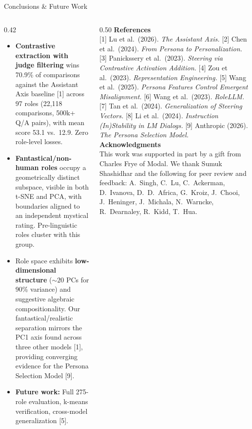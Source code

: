 \documentclass[final,t]{beamer}
\begin{document}
\begin{frame}[t]
\vspace{0mm}

\begin{block}{Conclusions \& Future Work}
\begin{columns}[T]
\begin{column}{0.42\textwidth}
\begin{itemize}[leftmargin=1em, itemsep=2pt, topsep=0pt, parsep=0pt, label=$\bullet$]
  \item \textbf{Contrastive extraction with judge filtering} wins
    70.9\% of comparisons against the Assistant Axis baseline [1]
    across 97 roles (22,118 comparisons, 500k+ Q/A pairs),
    with mean score 53.1 vs.\ 12.9. Zero role-level losses.
  \item \textbf{Fantastical/non-human roles} occupy a
    geometrically distinct subspace, visible in both t-SNE and
    PCA, with boundaries aligned to an independent mystical
    rating. Pre-linguistic roles cluster with this group.
  \item Role space exhibits \textbf{low-dimensional structure}
    (${\sim}20$ PCs for 90\% variance) and suggestive algebraic
    compositionality. Our fantastical/realistic separation
    mirrors the PC1 axis found across three other models [1],
    providing converging evidence for the Persona Selection
    Model [9].
  \item \textbf{Future work:} Full 275-role evaluation,
    k-means verification, cross-model generalization [5].
\end{itemize}
\end{column}
\begin{column}{0.50\textwidth}
{\small\textbf{References}}\\[1pt]
{\scriptsize
{[1]} Lu et al.\ (2026). \textit{The Assistant Axis.}
{[2]} Chen et al.\ (2024). \textit{From Persona to Personalization.}
{[3]} Panickssery et al.\ (2023). \textit{Steering via Contrastive Activation Addition.}
{[4]} Zou et al.\ (2023). \textit{Representation Engineering.}
{[5]} Wang et al.\ (2025). \textit{Persona Features Control Emergent Misalignment.}
{[6]} Wang et al.\ (2023). \textit{RoleLLM.}
{[7]} Tan et al.\ (2024). \textit{Generalization of Steering Vectors.}
{[8]} Li et al.\ (2024). \textit{Instruction (In)Stability in LM Dialogs.}
{[9]} Anthropic (2026). \textit{The Persona Selection Model.}\\[2pt]
}
{\small\textbf{Acknowledgments}}\\[1pt]
{\scriptsize
This work was supported in part by a gift from Charles Frye of Modal.
We thank Sumuk Shashidhar and the following for peer review and
feedback: A.~Singh, C.~Lu, C.~Ackerman, D.~Ivanova,
D.~D.~Africa, G.~Kroiz, J.~Chooi, J.~Heninger, J.~Michala,
N.~Warncke, R.~Dearnaley, R.~Kidd, T.~Hua.
}
\end{column}
\end{columns}
\end{block}

\end{frame}
\end{document}
